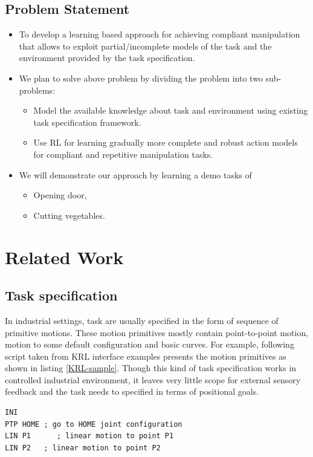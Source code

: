 \documentclass[thesis]{mas_proposal}
\begin{document}
\section{Problem Statement}
\begin{itemize}
	\item To develop a learning based approach for achieving compliant manipulation that allows to exploit partial/incomplete models
	of the task and the environment provided by the task specification.
	\item We plan to solve above problem by dividing the problem into two sub-problems:
	\begin{itemize}
		\item Model the available knowledge about task and environment using existing task specification framework.
		\item Use RL for learning gradually more complete and robust action models for compliant and repetitive manipulation tasks.
	\end{itemize}
    \item We will demonstrate our approach by learning a demo tasks of 
    \begin{itemize}
    	\item Opening door,
    	\item Cutting vegetables.
    \end{itemize}
\end{itemize}


\chapter{Related Work}
\section{Task specification}
In industrial settings, task are usually specified in the form of sequence of primitive motions\cite{leidner2017cognitive}. These motion primitives mostly contain point-to-point motion, motion to some default configuration and basic curves. For example, following script taken from KRL interface examples presents the motion primitives as shown in listing \ref{KRL-sample}. Though this kind of task specification works in controlled industrial environment, it leaves very little scope for external sensory feedback and the task needs to specified in terms of positional goals.

\begin{lstlisting}[label=KRL-sample,caption=KUKA Robot Language code]
INI
PTP HOME ; go to HOME joint configuration
LIN P1      ; linear motion to point P1
LIN P2	 ; linear motion to point P2
\end{lstlisting}
\end{document}
